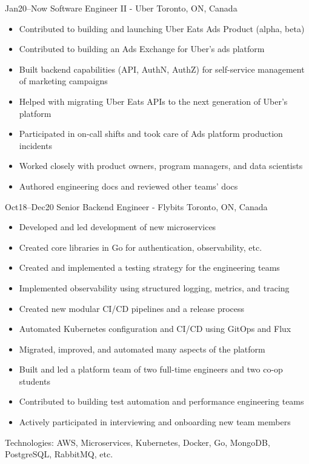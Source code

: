 \documentclass[]{cv-style}                     %
\begin{document}
\begin{entrylist}

  \entry
  {\small Jan20--Now}
  {Software Engineer II - Uber}
  {Toronto, ON, Canada}
  {
    \begin{itemize}
      \item Contributed to building and launching Uber Eats Ads Product (alpha, beta)
      \item Contributed to building an Ads Exchange for Uber's ads platform
      \item Built backend capabilities (API, AuthN, AuthZ) for self-service management of marketing campaigns
      \item Helped with migrating Uber Eats APIs to the next generation of Uber's platform
      \item Participated in on-call shifts and took care of Ads platform production incidents
      \item Worked closely with product owners, program managers, and data scientists
      \item Authored engineering docs and reviewed other teams' docs
    \end{itemize}
  }

  \entry
  {\small Oct18--Dec20}
  {Senior Backend Engineer - Flybits}
  {Toronto, ON, Canada}
  {
    \begin{itemize}
      \item Developed and led development of new microservices
      \item Created core libraries in Go for authentication, observability, etc.
      \item Created and implemented a testing strategy for the engineering teams
      \item Implemented observability using structured logging, metrics, and tracing
      \item Created new modular CI/CD pipelines and a release process
      \item Automated Kubernetes configuration and CI/CD using GitOps and Flux
      \item Migrated, improved, and automated many aspects of the platform
      \item Built and led a platform team of two full-time engineers and two co-op students
      \item Contributed to building test automation and performance engineering teams
      \item Actively participated in interviewing and onboarding new team members
    \end{itemize}
    Technologies: AWS, Microservices, Kubernetes, Docker, Go, MongoDB, PostgreSQL, RabbitMQ, etc.
  }


\end{entrylist}
\end{document}
